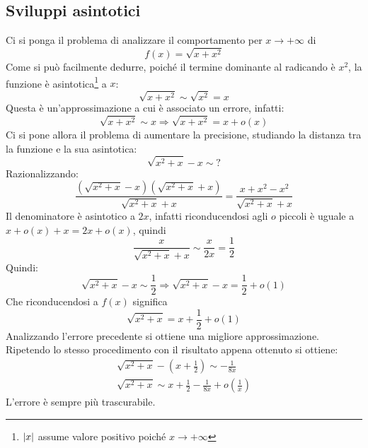 \subsection{Sviluppi asintotici}
Ci si ponga il problema di analizzare il comportamento per $x\to+\infty$ di
\[
	f(x)=\sqrt{x+x^2}
\]
Come si può facilmente dedurre, poiché il termine dominante al radicando è $x^2$, la funzione è asintotica\footnote{$\left\lvert x \right\rvert$ assume valore positivo poiché $x\to+\infty$} a $x$:
\[
	\sqrt{x+x^2}\sim\sqrt{x^2}=x
\]
Questa è un'approssimazione a cui è associato un errore, infatti:
\[
	\sqrt{x+x^2}\sim x\Rightarrow \sqrt{x+x^2}=x+o(x)
\]
Ci si pone allora il problema di aumentare la precisione, studiando la distanza tra la funzione e la sua asintotica:
\[
	\sqrt{x^2+x}-x\sim?
\]
Razionalizzando:
\[
	\frac{(\sqrt{x^2+x}-x)(\sqrt{x^2+x}+x)}{\sqrt{x^2+x}+x}=\frac{x+x^2-x^2}{\sqrt{x^2+x}+x}
\]
Il denominatore è asintotico a $2x$, infatti riconducendosi agli $o$ piccoli è uguale a $x+o(x)+x=2x+o(x)$, quindi
\[
	\frac{x}{\sqrt{x^2+x}+x}\sim\frac{x}{2x}=\frac{1}{2}
\]
Quindi:
\[
	\sqrt{x^2+x}-x\sim\frac{1}{2}\Rightarrow\sqrt{x^2+x}-x=\frac{1}{2}+o(1)
\]
Che riconducendosi a $f(x)$ significa
\[
	\sqrt{x^2+x}=x+\frac{1}{2}+o(1)
\]
Analizzando l'errore precedente si ottiene una migliore approssimazione. Ripetendo lo stesso procedimento con il risultato appena ottenuto si ottiene:
\begin{gather*}
	\sqrt{x^2+x}-\left(x+\frac{1}{2}\right)\sim-\frac{1}{8x}\\
	\sqrt{x^2+x}\sim x+\frac{1}{2}-\frac{1}{8x}+o\left(\frac{1}{x}\right)
\end{gather*}
L'errore è sempre più trascurabile.

